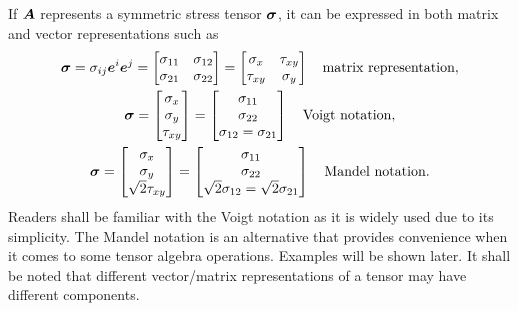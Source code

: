 If $\bm{A}$ represents a symmetric stress tensor $\bm{\sigma}$, it can be expressed in both matrix and vector representations such as
\begin{gather}\label{eq:tensor_stress}
\bm{\sigma}=\sigma_{ij}\bm{e}^i\bm{e}^j=\begin{bmatrix}
\sigma_{11}&\sigma_{12}\\
\sigma_{21}&\sigma_{22}
\end{bmatrix}=\begin{bmatrix}
\sigma_x&\tau_{xy}\\
\tau_{xy}&\sigma_y
\end{bmatrix}\quad\text{matrix representation},\\
\bm{\sigma}=\begin{bmatrix}
\sigma_x\\\sigma_y\\\tau_{xy}
\end{bmatrix}=\begin{bmatrix}
\sigma_{11}\\\sigma_{22}\\\sigma_{12}=\sigma_{21}
\end{bmatrix}\quad\text{Voigt notation},\\
\bm{\sigma}=\begin{bmatrix}
\sigma_x\\\sigma_y\\\sqrt{2}\tau_{xy}
\end{bmatrix}=\begin{bmatrix}
\sigma_{11}\\\sigma_{22}\\\sqrt{2}\sigma_{12}=\sqrt{2}\sigma_{21}
\end{bmatrix}\quad\text{Mandel notation}.
\end{gather}
Readers shall be familiar with the Voigt notation as it is widely used due to its simplicity.
The Mandel notation is an alternative that provides convenience when it comes to some tensor algebra operations.
Examples will be shown later.
It shall be noted that different vector/matrix representations of a tensor may have different components.

